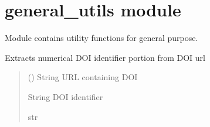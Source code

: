 \documentclass[letterpaper,10pt,english]{sphinxmanual}
\begin{document}
\sphinxstepscope


\section{general\_utils module}
\label{\detokenize{general_utils:module-general_utils}}\label{\detokenize{general_utils:general-utils-module}}\label{\detokenize{general_utils::doc}}
\sphinxAtStartPar
Module contains utility functions for general purpose.

\begin{fulllineitems}
\label{\detokenize{general_utils:general_utils.extract_doi_from_url}}
\pysigstartsignatures
\pysiglinewithargsret
{}
{}
{}
\pysigstopsignatures
\sphinxAtStartPar
Extracts numerical DOI identifier portion from DOI url
\begin{quote}\begin{description}
\sphinxAtStartPar
{} () \textendash{} String URL containing DOI

\sphinxAtStartPar
String DOI identifier

\sphinxAtStartPar
str

\end{description}\end{quote}

\end{fulllineitems}

\end{document}

